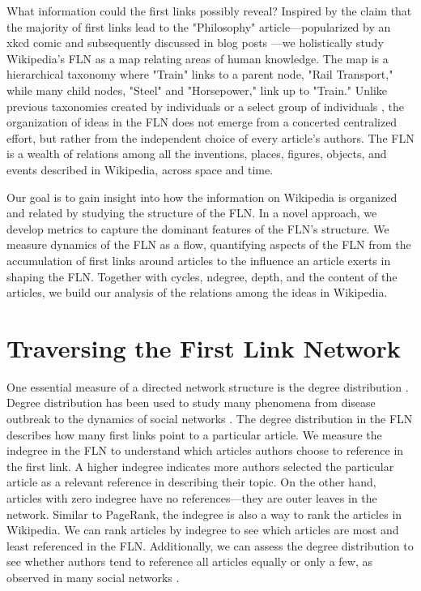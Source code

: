 \documentclass[pre,twocolumn,twoside,superscriptaddress,floatfix, aps, 10pt]{revtex4-1}
\begin{document}
What information could the first links possibly reveal?
Inspired by the claim that the majority of first links lead to the 
"Philosophy" article---popularized by an xkcd comic and subsequently
discussed in blog posts ---we holistically study 
Wikipedia's FLN as a map relating areas of human knowledge. 
The map is a hierarchical taxonomy where "Train" links to a parent node, 
"Rail Transport," while many child nodes, "Steel" and "Horsepower," link up to 
"Train." Unlike previous taxonomies
created by individuals
\cite{locke}
\cite{descartes}
\cite{aristotle} 
or a select group of individuals 
\cite{hist_thesaurus}, 
the organization of ideas in the FLN 
does not emerge from a concerted centralized effort, 
but rather from the independent choice of every article's authors.
The FLN is a wealth of relations among all the inventions, places,
figures, objects, and events described in Wikipedia, across space and time.


Our goal is to gain insight into how the information on Wikipedia is organized and related
by studying the structure of the FLN.
In a novel approach, we develop metrics to capture 
the dominant features of the FLN's structure.
We measure dynamics of the FLN as a flow, quantifying 
aspects of the FLN from the accumulation of first links around articles 
to the influence an article exerts in shaping the FLN.
Together with cycles, ndegree, depth, and the content of the articles, 
we build our analysis of the relations among the ideas in Wikipedia.


\section{Traversing the First Link Network}

One essential measure of a directed network structure is the degree distribution 
\cite{newman}. 
Degree distribution has been used to study many phenomena from disease outbreak 
\cite{disease} 
to the dynamics of social networks 
\cite{social_nets}.
The degree distribution in the FLN describes how many first links point to a particular article. 
We measure the indegree in the FLN to understand which articles authors choose to reference in 
the first link.
A higher indegree indicates more authors selected the particular article
as a relevant reference in describing their topic. On the other hand, articles with zero 
indegree have no references---they are outer leaves in the network. 
Similar to PageRank, the indegree is also a way to rank the articles in Wikipedia.
We can rank articles by indegree to see which articles are most and least referenced in the FLN. 
Additionally, we can assess the degree distribution to see whether authors tend to reference all articles
equally or only a few, as observed in many social networks \cite{social_nets}.
\end{document}
